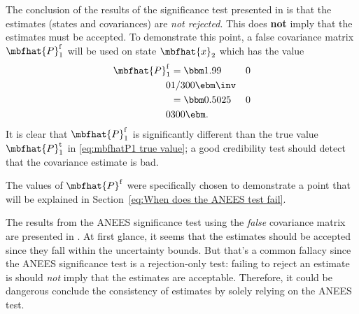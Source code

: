 \documentclass{simple-article}
\begin{document}
The conclusion of the results of the significance test presented in  is that the estimates (states and covariances) are \emph{not rejected}. This does \textbf{not} imply that the estimates must be accepted. To demonstrate this point, a false covariance matrix $\mbfhat{P}_{1}^{\mathrm{f}}$ will be used on state $\mbfhat{x}_{2}$ which has the value
\begin{align}
  \mbfhat{P}^{\mathrm{f}}_{1} 
        &= \bbm 1.99 & 0\\ 0 & 1/300 \ebm\inv\\
        \label{eq:false covariance 1}
        &= \bbm 0.5025 & 0\\ 0 & 300 \ebm.
\end{align}
It is clear that $\mbfhat{P}_{1}^{\mathrm{f}}$ is significantly different than the true value $\mbfhat{P}_{1}^{\mathrm{t}}$ in \eqref{eq:mbfhatP1 true value}; a good credibility test should detect that the covariance estimate is bad. 
\begin{blackBox}
  The values of $\mbfhat{P}^{\mathrm{f}}$ were specifically chosen to demonstrate a point that will be explained in Section~\ref{eq:When does the ANEES test fail}.
\end{blackBox}

The results from the ANEES significance test using the \emph{false} covariance matrix are presented in . At first glance, it seems that the estimates should be accepted since they fall within the uncertainty bounds. But that's a common fallacy since the ANEES significance test is a rejection-only test: failing to reject an estimate is should \emph{not} imply that the estimates are acceptable. Therefore, it could be dangerous conclude the consistency of estimates by solely relying on the ANEES test.
\end{document}

